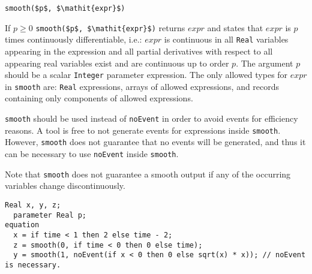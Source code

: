 \begin{operatordefinition}[smooth]
\begin{synopsis}\begin{lstlisting}
smooth($p$, $\mathit{expr}$)
\end{lstlisting}\end{synopsis}
\begin{semantics}
If $p \geq 0$ \lstinline!smooth($p$, $\mathit{expr}$)! returns $\mathit{expr}$ and states that $\mathit{expr}$ is $p$ times continuously differentiable, i.e.: $\mathit{expr}$ is continuous in all \lstinline!Real! variables appearing in the expression and all partial derivatives with respect to all appearing real variables exist and are continuous up to order $p$.  The argument $p$ should be a scalar \lstinline!Integer! parameter expression.  The only allowed types for $\mathit{expr}$ in \lstinline!smooth! are: \lstinline!Real! expressions, arrays of allowed expressions, and records containing only components of allowed expressions.

\lstinline!smooth! should be used instead of \lstinline!noEvent! in order to avoid events for efficiency reasons.  A tool is free to not generate events for expressions inside \lstinline!smooth!. However, \lstinline!smooth! does not guarantee that no events will be generated, and thus it can be necessary to use \lstinline!noEvent! inside \lstinline!smooth!.

\begin{nonnormative}
Note that \lstinline!smooth! does not guarantee a smooth output if any of the occurring variables change discontinuously.
\end{nonnormative}

\begin{example}
\begin{lstlisting}[language=modelica]
  Real x, y, z;
  parameter Real p;
equation
  x = if time < 1 then 2 else time - 2;
  z = smooth(0, if time < 0 then 0 else time);
  y = smooth(1, noEvent(if x < 0 then 0 else sqrt(x) * x)); // noEvent is necessary.
\end{lstlisting}
\end{example}
\end{semantics}
\end{operatordefinition}

